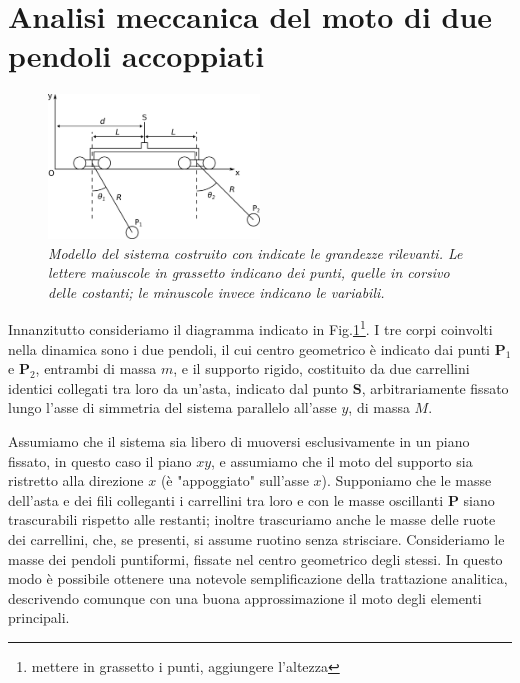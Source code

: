 \documentclass[11pt, a4paper, twoside]{article}
\begin{document}
\section{Analisi meccanica del moto di due pendoli accoppiati}
\begin{figure}[h]
    \centering
    \includegraphics[width=0.5\textwidth]{../../media/cad/sketch.pdf}
    \caption{\textit{Modello del sistema costruito con indicate
     le grandezze rilevanti. Le lettere maiuscole in grassetto indicano dei punti, quelle in corsivo delle 
     costanti; le minuscole invece indicano le variabili.} }
    \label{pendolicorpolibero}
\end{figure}
Innanzitutto consideriamo il diagramma indicato in Fig.\ref{pendolicorpolibero}\footnote{mettere in grassetto i punti, aggiungere l'altezza}.
I tre corpi coinvolti nella dinamica sono i due pendoli, il cui centro 
geometrico è indicato dai punti $\mathbf{P}_1$ e $\mathbf{P}_2$, entrambi di massa $m$,
e il supporto rigido, costituito da due carrellini identici collegati tra loro da un'asta,
indicato dal punto $\mathbf{S}$, arbitrariamente fissato lungo l'asse di simmetria del sistema 
parallelo all'asse $y$, di massa $M$.

Assumiamo che il sistema sia libero di muoversi esclusivamente in un piano fissato, in questo caso
il piano $xy$, e assumiamo che il moto del supporto sia ristretto alla direzione $x$ (è "appoggiato" sull'asse $x$).
Supponiamo che le masse dell'asta e dei fili colleganti i carrellini tra loro
e con le masse oscillanti $\mathbf{P}$ siano trascurabili rispetto alle restanti; 
inoltre trascuriamo anche le masse delle ruote dei carrellini, che, se presenti, si assume ruotino senza strisciare.
Consideriamo le masse dei pendoli puntiformi, fissate nel centro geometrico degli stessi.
In questo modo è possibile ottenere una notevole semplificazione della trattazione analitica,
descrivendo comunque con una buona approssimazione il moto degli elementi principali.
\end{document}

